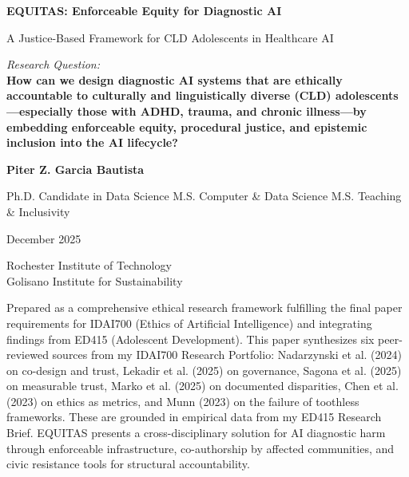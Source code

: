 \documentclass[12pt,a4paper]{article}
\begin{document}
\begin{titlepage}
\centering
\vspace*{2.5cm}

{\Large \textbf{EQUITAS: Enforceable Equity for Diagnostic AI}}

\vspace{0.6cm}

{\large A Justice-Based Framework for CLD Adolescents in Healthcare AI}

\vspace{1.4cm}

{\normalsize \textit{Research Question:} \\
\textbf{How can we design diagnostic AI systems that are ethically accountable to culturally and linguistically diverse (CLD) adolescents—especially those with ADHD, trauma, and chronic illness—by embedding enforceable equity, procedural justice, and epistemic inclusion into the AI lifecycle?}}

\vspace{2cm}

{\large \textbf{Piter Z. Garcia Bautista} \par}
{\large Ph.D. Candidate in Data Science \textbullet{} M.S. Computer \& Data Science \textbullet{} M.S. Teaching \& Inclusivity}

\vspace{0.5cm}

{\normalsize December 2025}

\vspace{2cm}

{\small Rochester Institute of Technology \\ Golisano Institute for Sustainability}

\vfill

{\footnotesize
Prepared as a comprehensive ethical research framework fulfilling the final paper requirements for IDAI700 (Ethics of Artificial Intelligence) and integrating findings from ED415 (Adolescent Development). This paper synthesizes six peer-reviewed sources from my IDAI700 Research Portfolio: Nadarzynski et al. (2024) on co-design and trust, Lekadir et al. (2025) on governance, Sagona et al. (2025) on measurable trust, Marko et al. (2025) on documented disparities, Chen et al. (2023) on ethics as metrics, and Munn (2023) on the failure of toothless frameworks. These are grounded in empirical data from my ED415 Research Brief. EQUITAS presents a cross-disciplinary solution for AI diagnostic harm through enforceable infrastructure, co-authorship by affected communities, and civic resistance tools for structural accountability.
}

\end{titlepage}
\end{document}
